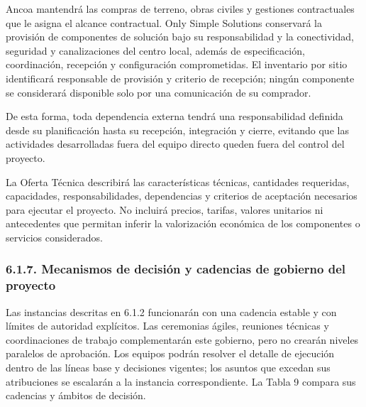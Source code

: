 \documentclass[11pt]{article}
\begin{document}
Ancoa mantendrá las compras de terreno, obras civiles y gestiones
contractuales que le asigna el alcance contractual. Only Simple
Solutions conservará la provisión de componentes de solución bajo su
responsabilidad y la conectividad, seguridad y canalizaciones del centro
local, además de especificación, coordinación, recepción y configuración
comprometidas. El inventario por sitio identificará responsable de
provisión y criterio de recepción; ningún componente se considerará
disponible solo por una comunicación de su comprador.

De esta forma, toda dependencia externa tendrá una responsabilidad
definida desde su planificación hasta su recepción, integración y
cierre, evitando que las actividades desarrolladas fuera del equipo
directo queden fuera del control del proyecto.

La Oferta Técnica describirá las características técnicas, cantidades
requeridas, capacidades, responsabilidades, dependencias y criterios de
aceptación necesarios para ejecutar el proyecto. No incluirá precios,
tarifas, valores unitarios ni antecedentes que permitan inferir la
valorización económica de los componentes o servicios considerados.

\subsubsection{6.1.7. Mecanismos de decisión y cadencias de gobierno del proyecto}\label{6-1-7-mecanismos-de-decision-y-cadencias-de-gobierno-del-proyecto}

Las instancias descritas en 6.1.2 funcionarán con una cadencia estable y con límites de autoridad explícitos. Las ceremonias ágiles, reuniones técnicas y coordinaciones de trabajo complementarán este gobierno, pero no crearán niveles paralelos de aprobación. Los equipos podrán resolver el detalle de ejecución dentro de las líneas base y decisiones vigentes; los asuntos que excedan sus atribuciones se escalarán a la instancia correspondiente. La Tabla 9 compara sus cadencias y ámbitos de decisión.
\end{document}
